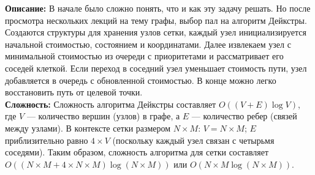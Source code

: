 \documentclass{article}
\newcommand{\descr}[2]{%
    \textbf{Описание: } #1\\
    \textbf{Сложность: } #2
}
\begin{document}
\descr{В начале было сложно понять, что и как эту задачу решать. Но после просмотра нескольких лекций на тему графы, выбор пал на алгоритм Дейкстры. Создаются структуры для хранения узлов сетки, каждый узел инициализируется начальной стоимостью, состоянием и координатами. Далее извлекаем узел с минимальной стоимостью из очереди с приоритетами и рассматривает его соседей клеткой. 
Если переход в соседний узел уменьшает стоимость пути, узел добавляется в очередь с обновленной стоимостью. В конце можно легко восстановить путь от целевой точки.}{
    Сложность алгоритма Дейкстры составляет \( O((V + E) \log V) \), где \( V \) — количество вершин (узлов) в графе, а \( E \) — количество ребер (связей между узлами). 
    В контексте сетки размером \( N \times M \):
    \( V = N \times M \); \( E \) приблизительно равно \( 4 \times V \) (поскольку каждый узел связан с четырьмя соседями).
    Таким образом, сложность алгоритма для сетки составляет \( O((N \times M + 4 \times N \times M) \log (N \times M)) \) или \( O(N \times M \log (N \times M)) \).
}\\
\end{document}
